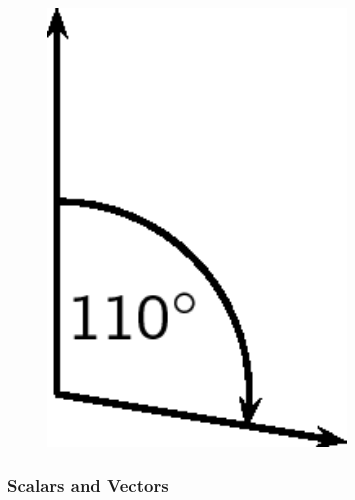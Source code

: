 	\begin{figure}[H] %
    \begin{center}
    \label{m38812*id187462!!!underscore!!!media}\label{m38812*id187462!!!underscore!!!printimage}\includegraphics[width=300px]{col11305.imgs/m38812_PG11C1_006.png} %
        
      \vspace{2pt}
    \vspace{.1in}
    
    \end{center}

 \end{figure}   

    \addtocounter{footnote}{-0}
    
        \par 
\label{m38812*secfhsst!!!underscore!!!id146}
            \subsubsection{  Scalars and Vectors }
            \nopagebreak
            
